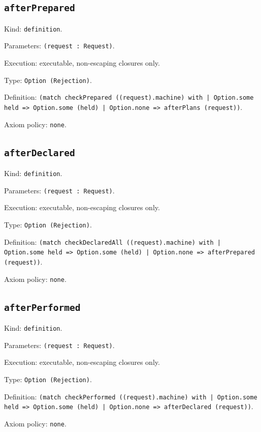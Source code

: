 \documentclass[11pt]{article}
\begin{document}
\subsection*{\texttt{afterPrepared}}
\noindent Kind: \texttt{definition}.\par
\noindent Parameters: \texttt{(request : Request)}.\par
\noindent Execution: executable, non-escaping closures only.\par
\noindent Type: \texttt{Option (Rejection)}.\par
\noindent Definition: \texttt{(match checkPrepared ((request).machine) with | Option.some held => Option.some (held) | Option.none => afterPlans (request))}.\par
\noindent Axiom policy: \texttt{none}.\par
\subsection*{\texttt{afterDeclared}}
\noindent Kind: \texttt{definition}.\par
\noindent Parameters: \texttt{(request : Request)}.\par
\noindent Execution: executable, non-escaping closures only.\par
\noindent Type: \texttt{Option (Rejection)}.\par
\noindent Definition: \texttt{(match checkDeclaredAll ((request).machine) with | Option.some held => Option.some (held) | Option.none => afterPrepared (request))}.\par
\noindent Axiom policy: \texttt{none}.\par
\subsection*{\texttt{afterPerformed}}
\noindent Kind: \texttt{definition}.\par
\noindent Parameters: \texttt{(request : Request)}.\par
\noindent Execution: executable, non-escaping closures only.\par
\noindent Type: \texttt{Option (Rejection)}.\par
\noindent Definition: \texttt{(match checkPerformed ((request).machine) with | Option.some held => Option.some (held) | Option.none => afterDeclared (request))}.\par
\noindent Axiom policy: \texttt{none}.\par
\end{document}
